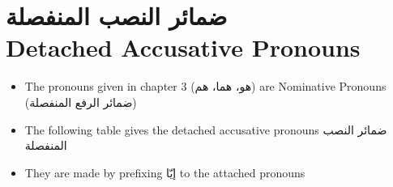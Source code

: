 \chapter{\textarabic{ضمائر النصب المنفصلة} \\ {Detached Accusative Pronouns}}

\begin{itemize}	    \setlength{\itemsep}{5pt}
	\item The pronouns given in chapter 3 \textarabic{(هو، هما، هم)} are Nominative Pronouns (\textarabic{ضمائر الرفع المنفصلة})
	\item The following table gives the detached accusative pronouns \textarabic{ضمائر النصب المنفصلة}
	\item They are made by prefixing \textarabic{إيّا} to the attached pronouns
	
\end{itemize}

